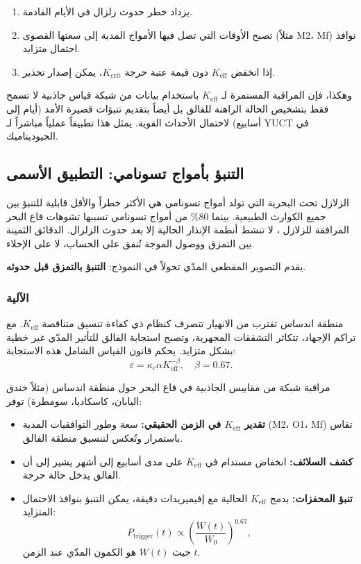 \documentclass[12pt,a4paper]{article}
\theoremstyle{remark}
\begin{document}
	\begin{enumerate}
		\item يزداد خطر حدوث زلزال في الأيام القادمة.
		\item تصبح الأوقات التي تصل فيها الأمواج المدية إلى سعتها القصوى (مثلاً M2، Mf) نوافذ احتمال متزايد.
		\item إذا انخفض \(K_{\mathrm{eff}}\) دون قيمة عتبة حرجة \(K_{\text{crit}}\)، يمكن إصدار تحذير.
	\end{enumerate}
	
	وهكذا، فإن المراقبة المستمرة لـ \(K_{\mathrm{eff}}\) باستخدام بيانات من شبكة قياس جاذبية لا تسمح فقط بتشخيص الحالة الراهنة للفالق بل أيضاً بتقديم تنبؤات قصيرة الأمد (أيام إلى أسابيع) لاحتمال الأحداث القوية. يمثل هذا تطبيقاً عملياً مباشراً لـ YUCT في الجيوديناميك.
	
	\subsection{التنبؤ بأمواج تسونامي: التطبيق الأسمى}
	\label{sec:tsunami}
	
	الزلازل تحت البحرية التي تولد أمواج تسونامي هي الأكثر خطراً والأقل قابلية للتنبؤ بين جميع الكوارث الطبيعية. بينما 80\% من أمواج تسونامي تسببها تشوهات قاع البحر المرافقة للزلازل \cite{NOAA2024, USGS2024}، لا تنشط أنظمة الإنذار الحالية إلا \textit{بعد} حدوث الزلزال. الدقائق الثمينة بين التمزق ووصول الموجة تُنفق على الحساب، لا على الإخلاء.
	
	يقدم التصوير المقطعي المدّي تحولاً في النموذج: \textbf{التنبؤ بالتمزق قبل حدوثه}.
	
	\subsubsection{الآلية}
	
	منطقة اندساس تقترب من الانهيار تتصرف كنظام ذي كفاءة تنسيق متناقصة \(K_{\mathrm{eff}}\). مع تراكم الإجهاد، تتكاثر التشققات المجهرية، وتصبح استجابة الفالق للتأثير المدّي غير خطية بشكل متزايد. يحكم قانون القياس الشامل هذه الاستجابة:
	\[
	\varepsilon = \kappa_c \alpha K_{\mathrm{eff}}^{-\beta}, \quad \beta = 0.67.
	\]
	
	مراقبة شبكة من مقاييس الجاذبية في قاع البحر حول منطقة اندساس (مثلاً خندق اليابان، كاسكاديا، سومطرة) توفر:
	\begin{itemize}
		\item \textbf{تقدير \(K_{\mathrm{eff}}\) في الزمن الحقيقي:} سعة وطور التوافقيات المدية (M2، O1، Mf) تقاس باستمرار وتُعكس لتنسيق منطقة الفالق.
		\item \textbf{كشف السلائف:} انخفاض مستدام في \(K_{\mathrm{eff}}\) على مدى أسابيع إلى أشهر يشير إلى أن الفالق يدخل حالة حرجة.
		\item \textbf{تنبؤ المحفزات:} بدمج \(K_{\mathrm{eff}}\) الحالية مع إفيميريدات دقيقة، يمكن التنبؤ بنوافذ الاحتمال المتزايد:
		\[
		P_{\text{trigger}}(t) \propto \left( \frac{W(t)}{W_0} \right)^{0.67},
		\]
		حيث \(W(t)\) هو الكمون المدّي عند الزمن \(t\).
	\end{itemize}
	
\end{document}
